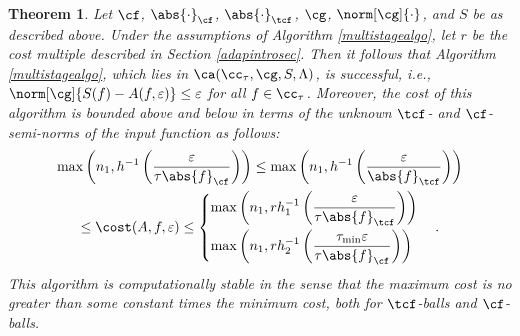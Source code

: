 \documentclass[]{elsarticle}
\newtheorem{theorem}{Theorem}
\theoremstyle{definition}
\theoremstyle{remark}
\newcommand{\Fnorm}[1]{\abs{#1}_{\cf}}
\newcommand{\Ftnorm}[1]{\abs{#1}_{\tcf}}
\newcommand{\Gnorm}[1]{\norm[\cg]{#1}}
\begin{document}
\begin{theorem}  \label{MultiStageThm}  Let $\cf$, $\Fnorm{\cdot}$, $\Ftnorm{\cdot}$, $\cg$, $\Gnorm{\cdot}$, and $S$ be as described above.  Under the assumptions of Algorithm \ref{multistagealgo}, let $r$ be the cost multiple described in Section \ref{adapintrosec}.  
Then it follows that Algorithm \ref{multistagealgo}, which lies in $\ca(\cc_{\tau},\cg,S,\Lambda)$, is successful,  i.e.,  $\norm[\cg]{S(f)-A(f,\varepsilon)} \le \varepsilon$ for all $f \in \cc_\tau$.  Moreover, the cost of this algorithm is bounded above and below in terms of the unknown $\tcf$- and $\cf$-semi-norms of the input function as follows:
\begin{multline} \label{automultistagedetcost}
\max \left(n_1, h^{-1}\left(\frac{\varepsilon}{\tau \Fnorm{f}} \right) \right) \le \max \left(n_1, h^{-1}\left(\frac{\varepsilon}{\Ftnorm{f}} \right) \right) \\ \le
\cost(A,f,\varepsilon)
\le \begin{cases}\displaystyle \max \left(n_1, rh_1^{-1}\left(\frac{\varepsilon}{\tau \Ftnorm{f}} \right) \right)\\[2ex]
\displaystyle \max \left(n_1, rh_2^{-1}\left(\frac{\tau_{\min}\varepsilon}{\tau \Fnorm{f}} \right) \right)
\end{cases}.
\end{multline}
This algorithm is computationally stable in the sense that the maximum cost is no greater than some constant times the minimum cost, both for $\tcf$-balls and $\cf$-balls.
\end{theorem}
\end{document}
